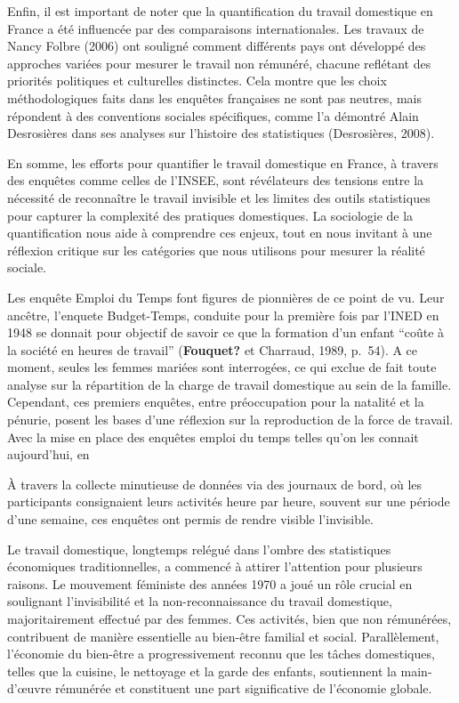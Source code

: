 \documentclass[
  12pt,
]{book}
\begin{document}
Enfin, il est important de noter que la quantification du travail
domestique en France a été influencée par des comparaisons
internationales. Les travaux de Nancy Folbre (2006) ont souligné comment
différents pays ont développé des approches variées pour mesurer le
travail non rémunéré, chacune reflétant des priorités politiques et
culturelles distinctes. Cela montre que les choix méthodologiques faits
dans les enquêtes françaises ne sont pas neutres, mais répondent à des
conventions sociales spécifiques, comme l'a démontré Alain Desrosières
dans ses analyses sur l'histoire des statistiques (Desrosières, 2008).

En somme, les efforts pour quantifier le travail domestique en France, à
travers des enquêtes comme celles de l'INSEE, sont révélateurs des
tensions entre la nécessité de reconnaître le travail invisible et les
limites des outils statistiques pour capturer la complexité des
pratiques domestiques. La sociologie de la quantification nous aide à
comprendre ces enjeux, tout en nous invitant à une réflexion critique
sur les catégories que nous utilisons pour mesurer la réalité sociale.

Les enquête Emploi du Temps font figures de pionnières de ce point de
vu. Leur ancêtre, l'enquete Budget-Temps, conduite pour la première fois
par l'INED en 1948 se donnait pour objectif de savoir ce que la
formation d'un enfant ``coûte à la société en heures de travail''
(\textbf{Fouquet?} et Charraud, 1989, p.~54). A ce moment, seules les
femmes mariées sont interrogées, ce qui exclue de fait toute analyse sur
la répartition de la charge de travail domestique au sein de la famille.
Cependant, ces premiers enquêtes, entre préoccupation pour la natalité
et la pénurie, posent les bases d'une réflexion sur la reproduction de
la force de travail. Avec la mise en place des enquêtes emploi du temps
telles qu'on les connait aujourd'hui, en

À travers la collecte minutieuse de données via des journaux de bord, où
les participants consignaient leurs activités heure par heure, souvent
sur une période d'une semaine, ces enquêtes ont permis de rendre visible
l'invisible.

Le travail domestique, longtemps relégué dans l'ombre des statistiques
économiques traditionnelles, a commencé à attirer l'attention pour
plusieurs raisons. Le mouvement féministe des années 1970 a joué un rôle
crucial en soulignant l'invisibilité et la non-reconnaissance du travail
domestique, majoritairement effectué par des femmes. Ces activités, bien
que non rémunérées, contribuent de manière essentielle au bien-être
familial et social. Parallèlement, l'économie du bien-être a
progressivement reconnu que les tâches domestiques, telles que la
cuisine, le nettoyage et la garde des enfants, soutiennent la
main-d'œuvre rémunérée et constituent une part significative de
l'économie globale.
\end{document}
